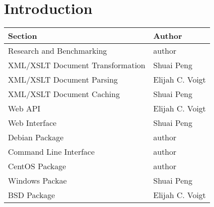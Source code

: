 \section{Introduction}

\begin{center}
    \begin{tabular}{ | l | p{10cm} |}
    \hline
    Section & Author \\ \hline
    Research and Benchmarking & author \\ \hline
    XML/XSLT Document Transformation & Shuai Peng \\ \hline
    XML/XSLT Document Parsing & Elijah C. Voigt \\ \hline
    XML/XSLT Document Caching & Shuai Peng \\ \hline
    Web API & Elijah C. Voigt\\ \hline
    Web Interface & Shuai Peng \\ \hline
    Debian Package & author\\ \hline
    Command Line Interface& author \\ \hline
    CentOS Package & author \\ \hline
    Windows Packae & Shuai Peng \\ \hline
    BSD Package & Elijah C. Voigt \\ \hline
    \end{tabular}
\end{center}

\tableofcontents

\newpage

\clearpage




\newpage
